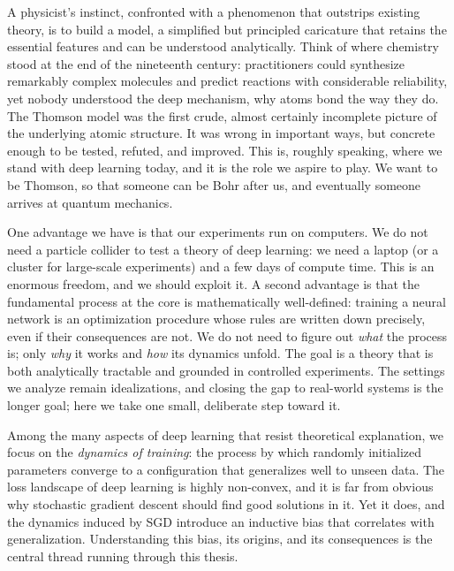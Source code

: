 A physicist's instinct, confronted with a phenomenon that outstrips existing theory,
is to build a model, a simplified but principled caricature that retains the
essential features and can be understood analytically.
Think of where chemistry stood at the end of the nineteenth century: practitioners
could synthesize remarkably complex molecules and predict reactions with
considerable reliability, yet nobody understood the deep mechanism, why atoms bond
the way they do.
The Thomson model was the first crude, almost certainly incomplete picture of the
underlying atomic structure.
It was wrong in important ways, but concrete enough to be tested, refuted, and
improved.
This is, roughly speaking, where we stand with deep learning today, and it is the
role we aspire to play.
We want to be Thomson, so that someone can be Bohr after us, and eventually
someone arrives at quantum mechanics.

One advantage we have is that our experiments run on computers.
We do not need a particle collider to test a theory of deep learning: we need a
laptop (or a cluster for large-scale experiments) and a few days of compute time.
This is an enormous freedom, and we should exploit it.
A second advantage is that the fundamental process at the core is mathematically
well-defined: training a neural network is an optimization procedure whose rules are
written down precisely, even if their consequences are not.
We do not need to figure out \emph{what} the process is; only \emph{why} it works
and \emph{how} its dynamics unfold.
The goal is a theory that is both analytically tractable and grounded in
controlled experiments.
The settings we analyze remain idealizations, and closing the gap to real-world
systems is the longer goal; here we take one small, deliberate step toward it.

Among the many aspects of deep learning that resist theoretical explanation, we
focus on the \emph{dynamics of training}: the process by which randomly initialized
parameters converge to a configuration that generalizes well to unseen data.
The loss landscape of deep learning is highly non-convex, and it is far from obvious
why stochastic gradient descent should find good solutions in it.
Yet it does, and the dynamics induced by SGD introduce an inductive bias that
correlates with generalization.
Understanding this bias, its origins, and its consequences is the central thread
running through this thesis.

